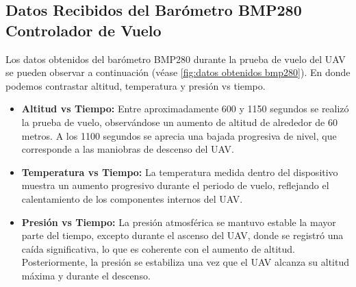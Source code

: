\subsection{Datos Recibidos del Barómetro BMP280 Controlador de Vuelo}
Los datos obtenidos del barómetro BMP280 durante la prueba de vuelo del UAV se pueden observar a continuación (véase \ref{fig:datos obtenidos bmp280}). En donde podemos contrastar altitud, temperatura y presión vs tiempo.\\
\begin{itemize}
    \item \textbf{Altitud vs Tiempo:} Entre aproximadamente 600 y 1150 segundos se realizó la prueba de vuelo, observándose un aumento de altitud de alrededor de 60 metros. A los 1100 segundos se aprecia una bajada progresiva de nivel, que corresponde a las maniobras de descenso del UAV.\\
    \item \textbf{Temperatura vs Tiempo:} La temperatura medida dentro del dispositivo muestra un aumento progresivo durante el periodo de vuelo, reflejando el calentamiento de los componentes internos del UAV.\\
    \item \textbf{Presión vs Tiempo:} La presión atmosférica se mantuvo estable la mayor parte del tiempo, excepto durante el ascenso del UAV, donde se registró una caída significativa, lo que es coherente con el aumento de altitud. Posteriormente, la presión se estabiliza una vez que el UAV alcanza su altitud máxima y durante el descenso.
    
\end{itemize}



